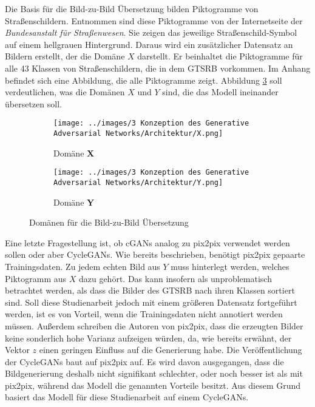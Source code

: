 Die Basis für die Bild-zu-Bild Übersetzung bilden Piktogramme von Straßenschildern. Entnommen sind diese Piktogramme von der Internetseite der \emph{Bundesanstalt für Straßenwesen}. Sie zeigen das jeweilige Straßenschild-Symbol auf einem hellgrauen Hintergrund. Daraus wird ein zusätzlicher Datensatz an Bildern erstellt, der die Domäne $X$ darstellt. Er beinhaltet die Piktogramme für alle 43 Klassen von Straßenschildern, die in dem \ac{GTSRB} vorkommen. Im Anhang befindet sich eine Abbildung, die alle Piktogramme zeigt. Abbildung \ref{fig:domains} soll verdeutlichen, was die Domänen $X$ und $Y$ sind, die das Modell ineinander übersetzen soll. \cite{piktogramme}

\begin{figure}[h]
	\centering
	\captionsetup[subfigure]{labelformat=empty}
	\begin{subfigure}[b]{0.125\textwidth}
		\centering
		\texttt{[image: ../images/3 Konzeption des Generative Adversarial Networks/Architektur/X.png]}
		\caption{Domäne \textbf{X}}
		\label{fig:domain-x}
	\end{subfigure}
	\hspace{3em}%
	\begin{subfigure}[b]{0.125\textwidth}
		\centering
		\texttt{[image: ../images/3 Konzeption des Generative Adversarial Networks/Architektur/Y.png]}
		\caption{Domäne \textbf{Y}}
		\label{fig:domain-y}
	\end{subfigure}
	\caption{Domänen für die Bild-zu-Bild Übersetzung}
	\label{fig:domains}
\end{figure}

Eine letzte Fragestellung ist, ob \acp{cGAN} analog zu pix2pix verwendet werden sollen oder aber \acp{CycleGAN}. Wie bereits beschrieben, benötigt pix2pix gepaarte Trainingsdaten. Zu jedem echten Bild aus $Y$ muss hinterlegt werden, welches Piktogramm aus $X$ dazu gehört. Das kann insofern als unproblematisch betrachtet werden, als dass die Bilder des \ac{GTSRB} nach ihren Klassen sortiert sind. Soll diese Studienarbeit jedoch mit einem größeren Datensatz fortgeführt werden, ist es von Vorteil, wenn die Trainingsdaten nicht annotiert werden müssen. Außerdem schreiben die Autoren von pix2pix, dass die erzeugten Bilder keine sonderlich hohe Varianz aufzeigen würden, da, wie bereits erwähnt, der Vektor $z$ einen geringen Einfluss auf die Generierung habe.
Die Veröffentlichung der \acp{CycleGAN} baut auf pix2pix auf. Es wird davon ausgegangen, dass die Bildgenerierung deshalb nicht signifikant schlechter, oder noch besser ist als mit pix2pix, während das Modell die genannten Vorteile besitzt. Aus diesem Grund basiert das Modell für diese Studienarbeit auf einem \acp{CycleGAN}.